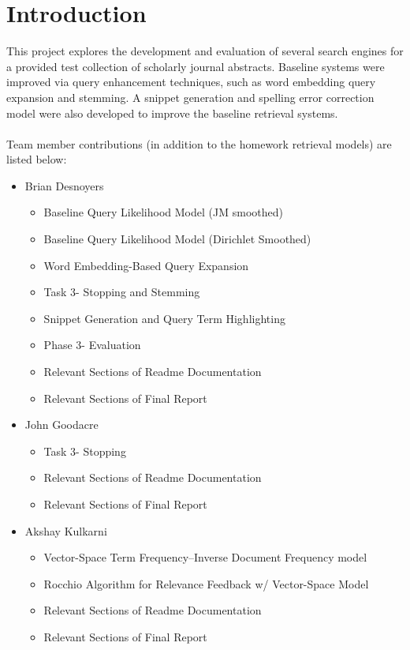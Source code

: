 \documentclass[conference]{IEEEtran}
\begin{document}
\section{Introduction}
This project explores the development and evaluation of several search engines for a provided test collection of scholarly journal abstracts. Baseline systems were improved via query enhancement techniques, such as word embedding query expansion and stemming. A snippet generation and spelling error correction model were also developed to improve the baseline retrieval systems.
\\\\
Team member contributions (in addition to the homework retrieval models) are listed below:
\begin{itemize}
\item Brian Desnoyers
\begin{itemize}
\item Baseline Query Likelihood Model (JM smoothed)
\item Baseline Query Likelihood Model (Dirichlet Smoothed)
\item Word Embedding-Based Query Expansion
\item Task 3- Stopping and Stemming
\item Snippet Generation and Query Term Highlighting
\item Phase 3- Evaluation
\item Relevant Sections of Readme Documentation
\item Relevant Sections of Final Report
\end{itemize}
\item John Goodacre
\begin{itemize}
\item Task 3- Stopping
\item Relevant Sections of Readme Documentation
\item Relevant Sections of Final Report
\end{itemize}
\item Akshay Kulkarni
\begin{itemize}
\item Vector-Space Term Frequency–Inverse Document Frequency model 
\item Rocchio Algorithm for Relevance Feedback w/ Vector-Space Model
\item Relevant Sections of Readme Documentation
\item Relevant Sections of Final Report
\end{itemize}
\end{itemize}
\end{document}
